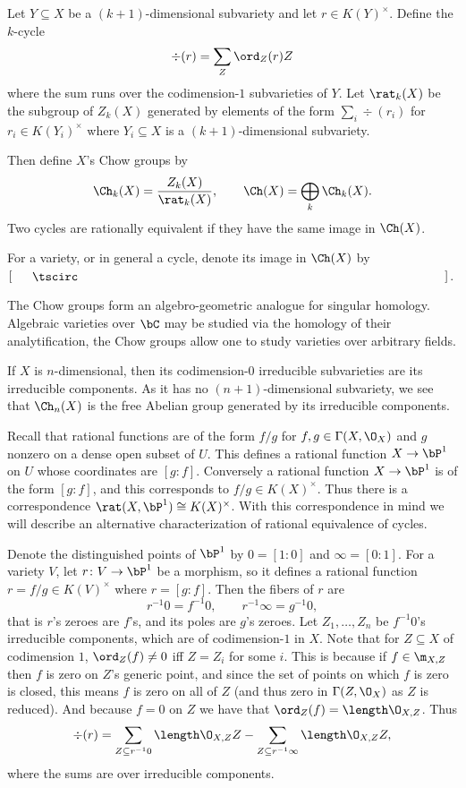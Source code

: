 \bdefn

    Let $Y\subseteq X$ be a $(k+1)$-dimensional subvariety and let $r\in K(Y)^\times$.
    Define the $k$-cycle
    $$ \div(r) = \sum_Z\ord_Z(r)Z $$
    where the sum runs over the codimension-$1$ subvarieties of $Y$.
    Let $\rat_k(X)$ be the subgroup of $Z_k(X)$ generated by elements of the form $\sum_i\div(r_i)$
    for $r_i\in K(Y_i)^\times$ where $Y_i\subseteq X$ is a $(k+1)$-dimensional subvariety.

    Then define $X$'s {\emphcolor Chow groups} by
    $$ \Ch_k(X) = \frac{Z_k(X)}{\rat_k(X)},\qquad \Ch(X) = \bigoplus_k\Ch_k(X) . $$
    Two cycles are {\emphcolor rationally equivalent} if they have the same image in $\Ch(X)$.

\edefn

For a variety, or in general a cycle, denote its image in $\Ch(X)$ by $[\bul]$.

The Chow groups form an algebro-geometric analogue for singular homology.
Algebraic varieties over $\bC$ may be studied via the homology of their analytification, the Chow groups allow one to study varieties
over arbitrary fields.

\bexam

    If $X$ is $n$-dimensional, then its codimension-$0$ irreducible subvarieties are its irreducible components.
    As it has no $(n+1)$-dimensional subvariety, we see that $\Ch_n(X)$ is the free Abelian group generated by its irreducible components.

\eexam

Recall that rational functions are of the form $f/g$ for $f,g\in\Gamma(X,\O_X)$ and $g$ nonzero on a dense open subset of $U$.
This defines a rational function $X\to\bP^1$ on $U$ whose coordinates are $[g:f]$.
Conversely a rational function $X\to\bP^1$ is of the form $[g:f]$, and this corresponds to $f/g\in K(X)^\times$.
Thus there is a correspondence $\rat(X,\bP^1)\cong K(X)^\times$.
With this correspondence in mind we will describe an alternative characterization of rational equivalence of cycles.

Denote the distinguished points of $\bP^1$ by $0=[1:0]$ and $\infty=[0:1]$.
For a variety $V$, let $r\colon V\to\bP^1$ be a morphism, so it defines a rational function $r=f/g\in K(V)^\times$ where $r=[g:f]$.
Then the fibers of $r$ are
$$ r^{-1}0 = f^{-1}0,\qquad r^{-1}\infty = g^{-1}0 , $$
that is $r$'s zeroes are $f$'s, and its poles are $g$'s zeroes.
Let $Z_1,\dots,Z_n$ be $f^{-1}0$'s irreducible components, which are of codimension-$1$ in $X$.
Note that for $Z\subseteq X$ of codimension $1$, $\ord_Z(f)\neq0$ iff $Z=Z_i$ for some $i$.
This is because if $f\in\m_{X,Z}$ then $f$ is zero on $Z$'s generic point, and since the set of points on which $f$ is zero is closed, this means $f$
is zero on all of $Z$ (and thus zero in $\Gamma(Z,\O_X)$ as $Z$ is reduced).
And because $f=0$ on $Z$ we have that $\ord_Z(f)=\length\O_{X,Z}$.
Thus
$$ \div(r) = \sum_{Z\subseteq r^{-1}0}\length\O_{X,Z}Z - \sum_{Z\subseteq r^{-1}\infty}\length\O_{X,Z}Z , $$
where the sums are over irreducible components.

